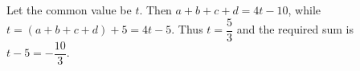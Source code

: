 Let the common value be $t$. Then $a+b+c+d=4t-10$, while $t=(a+b+c+d)+5=4t-5$. Thus $t=\dfrac{5}{3}$ and the required sum is $t-5=\boxed{-\dfrac{10}{3}}$.
